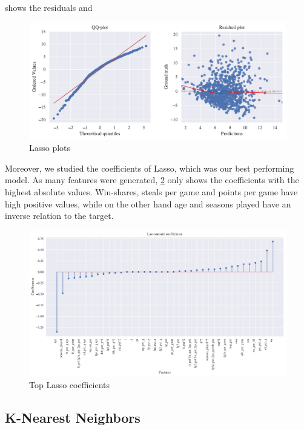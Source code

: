  shows the residuals and 

\begin{figure}[H]
    \centering
    \includegraphics[width=1.0\linewidth]{figures/Lasso_residuals.pdf}
    \caption{Lasso plots}
    \label{fig:lasso-res}
\end{figure}

Moreover, we studied the coefficients of Lasso, which was our best performing model. As many features were generated, \cref{fig:lasso-coeff} only shows the coefficients with the highest absolute values. Win-shares, steals per game and points per game have high positive values, while on the other hand age and seasons played have an inverse relation to the target. 

\begin{figure}[H]
    \centering
    \includegraphics[width=1.0\linewidth]{figures/Lasso_coeffs.pdf}
    \caption{Top Lasso coefficients}
    \label{fig:lasso-coeff}
\end{figure}

\subsection{K-Nearest Neighbors}%
\label{ssub:k-nearest-neighbors}

